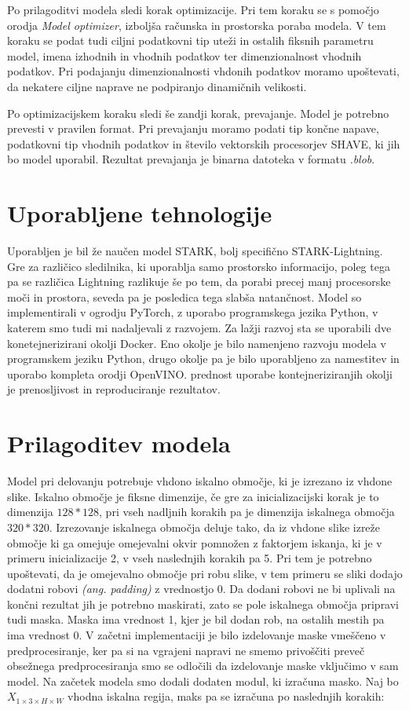 \documentclass[a4paper,12pt,openright]{book}
\begin{document}
Po prilagoditvi modela sledi korak optimizacije. Pri tem koraku se s pomočjo orodja \emph{Model optimizer}, izboljša računska in prostorska poraba modela. V tem koraku se podat tudi ciljni podatkovni tip uteži in ostalih fiksnih parametru model, imena izhodnih in vhodnih podatkov ter dimenzionalnost vhodnih podatkov. Pri podajanju dimenzionalnosti vhdonih podatkov moramo upoštevati, da nekatere ciljne naprave ne podpiranjo dinamičnih velikosti.

Po optimizacijskem koraku sledi še zandji korak, prevajanje. Model je potrebno prevesti v pravilen format. Pri prevajanju moramo podati tip končne napave, podatkovni tip vhodnih podatkov in število vektorskih procesorjev SHAVE, ki jih bo model uporabil. Rezultat prevajanja je binarna datoteka v formatu \emph{.blob}.

\section{Uporabljene tehnologije}
Uporabljen je bil že naučen model STARK, bolj specifično STARK-Lightning. Gre za različico sledilnika, ki uporablja samo prostorsko informacijo, poleg tega pa se različica Lightning razlikuje še po tem, da porabi precej manj procesorske moči in prostora, seveda pa je posledica tega slabša natančnost. Model so \cite{stark} implementirali v ogrodju PyTorch, z uporabo programskega jezika Python, v katerem smo tudi mi nadaljevali z razvojem. Za lažji razvoj sta se uporabili dve konetejnerizirani okolji Docker. Eno okolje je bilo namenjeno razvoju modela v programskem jeziku Python, drugo okolje pa je bilo uporabljeno za namestitev in uporabo kompleta orodji OpenVINO. prednost uporabe kontejneriziranjih okolji je prenosljivost in reproduciranje rezultatov.

\section{Prilagoditev modela}
Model pri delovanju potrebuje vhdono iskalno območje, ki je izrezano iz vhdone slike. Iskalno območje je fiksne dimenzije, če gre za inicializacijski korak je to dimenzija $128*128$, pri vseh nadljnih korakih pa je dimenzija iskalnega območja $ 320*320 $. Izrezovanje iskalnega območja deluje tako, da iz vhdone slike izreže območje ki ga omejuje omejevalni okvir pomnožen z faktorjem iskanja, ki je v primeru inicializacije 2, v vseh naslednjih korakih pa 5. Pri tem je potrebno upoštevati, da je omejevalno območje pri robu slike, v tem primeru se sliki dodajo dodatni robovi \emph{(ang. padding)} z vrednostjo 0. Da dodani robovi ne bi uplivali na končni rezultat jih je potrebno maskirati, zato se pole iskalnega območja pripravi tudi maska. Maska ima vrednost 1, kjer je bil dodan rob, na ostalih mestih pa ima vrednost 0. V začetni implementaciji je bilo izdelovanje maske vmeščeno v predprocesiranje, ker pa si na vgrajeni napravi ne smemo privoščiti preveč obsežnega predprocesiranja smo se odločili da izdelovanje maske vključimo v sam model. Na začetek modela smo dodali dodaten modul, ki izračuna masko. Naj bo $ X_{1 \times 3 \times H \times W} $ vhodna iskalna regija, maks pa se izračuna po naslednjih korakih:
\end{document}
